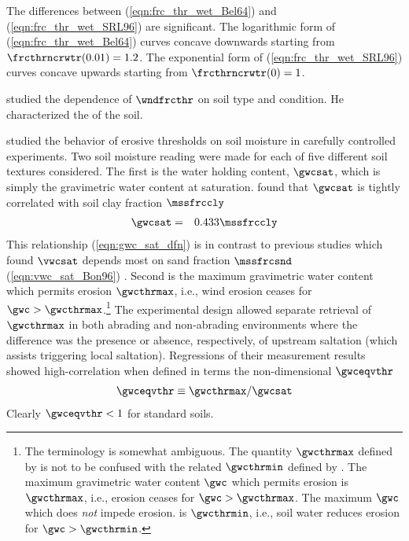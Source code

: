 \documentclass[12pt,twoside]{book}
\begin{document}
The differences between (\ref{eqn:frc_thr_wet_Bel64}) and
(\ref{eqn:frc_thr_wet_SRL96}) are significant.
The logarithmic form of (\ref{eqn:frc_thr_wet_Bel64}) curves concave
downwards starting from $\frcthrncrwtr(0.01) = 1.2$.
The exponential form of (\ref{eqn:frc_thr_wet_SRL96}) curves concave
upwards starting from $\frcthrncrwtr(0) = 1$.

\cite{Gil88} studied the dependence of $\wndfrcthr$ on soil type and
condition. 
He characterized the  of the soil.

\cite{SeF95} studied the behavior of erosive thresholds on soil
moisture in carefully controlled  experiments.
Two soil moisture reading were made for each of five different
soil textures considered. 
The first is the water holding content, $\gwcsat$, which is simply the 
gravimetric water content at saturation. 
\cite{SeF95} found that $\gwcsat$ is tightly correlated with
soil clay fraction $\mssfrccly$
\begin{eqnarray}
\gwcsat & = & 0.433 \mssfrccly
\label{eqn:gwc_sat_dfn}
\end{eqnarray}
This relationship (\ref{eqn:gwc_sat_dfn}) is in contrast to previous
studies which found $\vwcsat$ depends most on sand fraction
$\mssfrcsnd$ (\ref{eqn:vwc_sat_Bon96}) \cite[][]{ClH78,CHC84,Bon96}.  
Second is the maximum gravimetric water content which permits
erosion $\gwcthrmax$, i.e., wind erosion ceases for $\gwc >
\gwcthrmax$.\footnote{The terminology  is somewhat ambiguous.
The quantity $\gwcthrmax$ defined by \cite{SeF95} is not to be
confused with the related $\gwcthrmin$ defined by \cite{FMB99}. 
The maximum gravimetric water content $\gwc$ which permits erosion
is $\gwcthrmax$, i.e., erosion ceases for $\gwc > \gwcthrmax$.
The maximum $\gwc$ which does \textit{not} impede erosion. 
is $\gwcthrmin$, i.e., soil water reduces erosion for 
$\gwc > \gwcthrmin$.} %
The experimental design allowed separate retrieval of $\gwcthrmax$ in
both abrading and non-abrading environments where the difference was
the presence or absence, respectively, of upstream saltation (which
assists triggering local saltation). 
Regressions of their measurement results showed high-correlation when  
defined in terms the non-dimensional  $\gwceqvthr$
\begin{eqnarray}
\gwceqvthr \equiv \gwcthrmax/\gwcsat
\label{eqn:eqv_thr_mst_dfn}
\end{eqnarray}
Clearly $\gwceqvthr < 1$ for standard soils.
\end{document}

